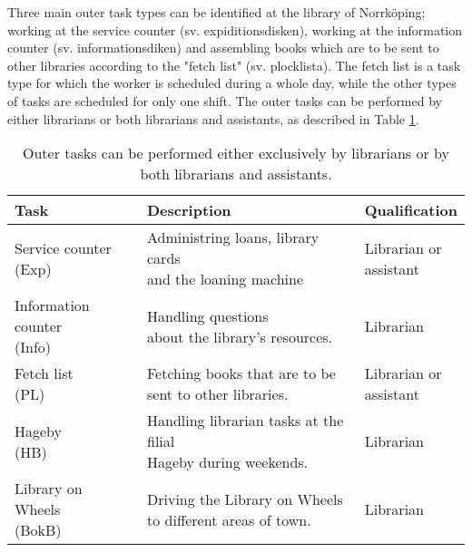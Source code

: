 Three main outer task types can be identified at the library of Norrköping; working at the service counter (sv. expiditionsdisken), working at the information counter (sv. informationsdiken) and assembling books which are to be sent to other libraries according to the "fetch list" (sv. plocklista). The fetch list is a task type for which the worker is scheduled during a whole day, while the other types of tasks are scheduled for only one shift. The outer tasks can be performed by either librarians or both librarians and assistants, as described in Table \ref{tab:Outer_Tasks}.

\begin{table}[h]
\centering
\caption{Outer tasks can be performed either exclusively by librarians or by both librarians and assistants.}
\label{tab:Outer_Tasks}
\begin{tabularx}{\textwidth}{|l|l|X|}
\hline
\textbf{Task} & \textbf{Description} & \textbf{Qualification}\\ \hline 
\specialcell[t]{Service counter \\ (Exp)}  & \specialcell[t]{Administring loans, library cards\\ and the loaning machine} & \specialcell[t]{Librarian or \\  assistant} 
\\ \hline
\specialcell[t]{Information counter \\ (Info)} & \specialcell[t]{Handling questions \\about the library's resources.} & Librarian
\\ \hline 
\specialcell[t]{Fetch list \\(PL)} & \specialcell[t]{Fetching books that are to be \\sent to other libraries.} & \specialcell[t]{Librarian  or \\  assistant}
\\ \hline 
\specialcell[t]{Hageby \\(HB)} & \specialcell[t]{Handling librarian tasks at the filial \\ Hageby during weekends.} & Librarian
\\ \hline 
\specialcell[t]{Library on Wheels \\(BokB)} & \specialcell[t]{Driving the Library on Wheels \\ to different areas of town.} & Librarian
\\ \hline 
\end{tabularx}
\end{table} 

